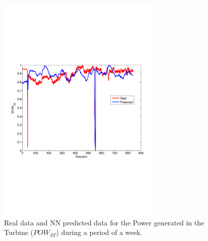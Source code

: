 \begin{figure}
\centering
\includegraphics[width=0.7\textwidth]{nne2bis.pdf}
\caption{Real data and NN predicted data for the Power generated in the Turbine ($POW_{ST}$) during a period of a week.}
\label{Pturbine}
\end{figure}




